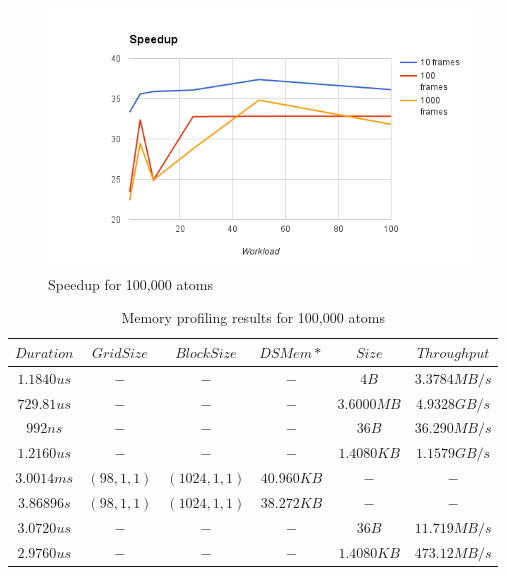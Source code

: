 \documentclass[12pt,letterpaper]{report}
\begin{document}
\begin{figure}[!tbp]
\begin{minipage}[b]{0.4\textwidth}
    \includegraphics[width=\textwidth]{images/speedup_100000}
    \caption{Speedup for 100,000 atoms}
     \label{fg:speedup_100000}
  \end{minipage}
\end{figure}


\begin{table}[h!]
	\renewcommand*{\arraystretch}{1.5}
	\tabcolsep=0.12cm
  \centering
  \begin{tabular}{| c | c | c | c | c | c |}
   \hline

 $Duration $ & $ Grid Size $ & $ Block Size $ & $ DSMem* $ & $ Size $ & $ Throughput $ \\ \hline 
 $1.1840us $ & $ - $ & $ - $ & $ - $ & $ 4B $ & $ 3.3784MB/s $ \\ \hline 
 $729.81us $ & $ - $ & $ - $ & $ - $ & $ 3.6000MB $ & $ 4.9328GB/s $ \\ \hline 
 $992ns $ & $ - $ & $ - $ & $ - $ & $ 36B $ & $ 36.290MB/s $ \\ \hline 
 $1.2160us $ & $ - $ & $ - $ & $ - $ & $ 1.4080KB $ & $ 1.1579GB/s $ \\ \hline 
 $3.0014ms $ & $ (98,1,1) $ & $ (1024,1,1) $ & $ 40.960KB $ & $ - $ & $ - $ \\ \hline 
 $3.86896s $ & $ (98,1,1) $ & $ (1024,1,1) $ & $ 38.272KB $ & $ - $ & $ - $ \\ \hline 
 $3.0720us $ & $ - $ & $ - $ & $ - $ & $ 36B $ & $ 11.719MB/s $ \\ \hline 
 $2.9760us $ & $ - $ & $ - $ & $ - $ & $ 1.4080KB $ & $ 473.12MB/s $ \\ \hline 

	\hline
  \end{tabular}
    \caption{Memory profiling results for 100,000 atoms}
    	  \label{tb:gpumem100000}
\end{table}
\end{document}
